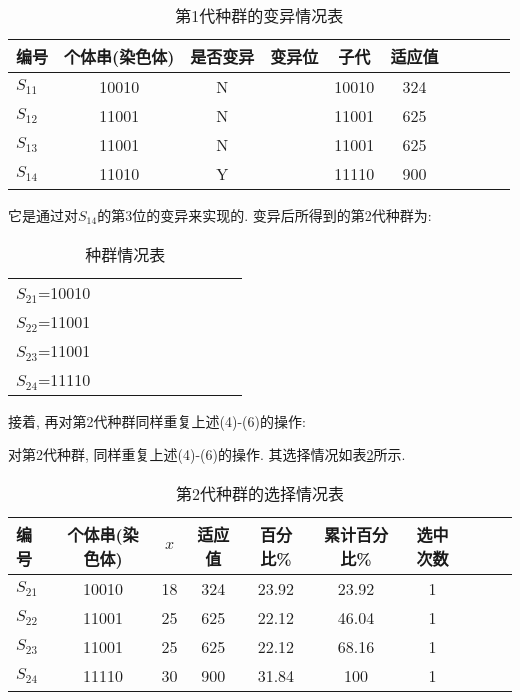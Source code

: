 \begin{table} [H]
\caption{第1代种群的变异情况表}
\begin{center}
\begin{tabular} {lccccccccc}
  \hline
编号&	个体串(染色体)	&是否变异&	变异位	&子代&	适应值\\
  \hline
$S_{11}$&	10010&	N&		&10010&	324\\
$S_{12}$&	11001&	N&		&11001&	625\\
$S_{13}$&	11001&	N&		&11001&	625\\
$S_{14}$&	11010&	Y&	    &11110&	900\\
\hline
\end{tabular}
\end{center}
\label{AI_table2019112809}
\end{table}
它是通过对$S_{14}$的第3位的变异来实现的. 变异后所得到的第2代种群为:
\begin{table} [H]
\caption{种群情况表}
\begin{center}
\begin{tabular} {lccccccccc}
\hline
$S_{21}$=10010\\
$S_{22}$=11001\\
$S_{23}$=11001\\
$S_{24}$=11110\\
\hline
\end{tabular}
\end{center}
\end{table}
接着, 再对第2代种群同样重复上述(4)-(6)的操作:

对第2代种群, 同样重复上述(4)-(6)的操作. 其选择情况如表\ref{AI_table2019112810}所示.

\begin{table} [H]
\caption{第2代种群的选择情况表}
\begin{center}
\begin{tabular} {lccccccccc}
  \hline
编号	&个体串(染色体)&	$x$	&适应值	&百分比\%	&累计百分比\%	&选中次数\\
  \hline
$S_{21}$&	10010&	18	&324	&23.92	&23.92	&1\\
$S_{22}$&11001&	25	&625	&22.12	&46.04	&1\\
$S_{23}$	&11001&	25	&625	&22.12	&68.16	&1\\
$S_{24}$ &11110 &30	&900	&31.84&	100&1\\
\hline
\end{tabular}
\end{center}
\label{AI_table2019112810}
\end{table}

